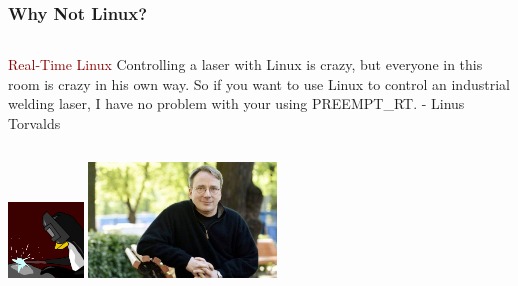 \documentclass{beamer}
\begin{document}
\begin{frame}
	\frametitle{Why Not Linux?}
	\begin{columns}[c]
		\begin{column}{12cm}
			\vspace{1cm}
			\begin{block}{\centering\textcolor{darkred}{Real-Time Linux}}
				\justifying
				Controlling a laser with Linux is crazy, but everyone in this room is crazy
				in his own way. So if you want to use Linux to control an industrial welding
				laser, I have no problem with your using PREEMPT\_RT.
				\vspace{.2cm}
				\hspace*{9.5cm}\footnotesize{- Linus Torvalds}
			\end{block}
		\end{column}
	\end{columns}
	\vspace{.5cm}
	\hspace*{.5cm}
	\includegraphics[width=2cm]{figs/preempt-rt.png}
	\hspace*{3cm}
	\includegraphics[width=5cm]{figs/linus-torvalds.jpg}
\end{frame}
\end{document}

